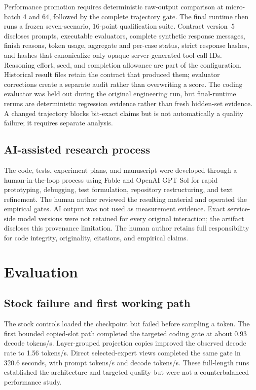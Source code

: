 \documentclass[10pt,twocolumn]{article}
\begin{document}
Performance promotion requires deterministic raw-output comparison at
micro-batch 4 and 64, followed by the complete trajectory gate.  The final
runtime then runs a frozen seven-scenario, 16-point qualification suite.
Contract version~5 discloses prompts, executable evaluators, complete
synthetic response messages, finish reasons, token usage, aggregate and
per-case status, strict response hashes, and hashes that canonicalize only
opaque server-generated tool-call IDs.  Reasoning effort, seed, and completion
allowance are part of the configuration.  Historical result files retain the
contract that produced them; evaluator corrections create a separate audit
rather than overwriting a score.  The coding evaluator was held out during
the original engineering run, but final-runtime reruns are deterministic
regression evidence rather than fresh hidden-set evidence.  A changed
trajectory blocks bit-exact claims but is not
automatically a quality failure; it requires separate analysis.

\subsection{AI-assisted research process}

The code, tests, experiment plans, and manuscript were developed through a
human-in-the-loop process using Fable and OpenAI GPT Sol for rapid prototyping,
debugging, test formulation, repository restructuring, and text refinement.
The human author reviewed the resulting material and operated the empirical
gates.  AI output was not used as measurement evidence.  Exact service-side
model versions were not retained for every original interaction; the artifact
discloses this provenance limitation.  The human author retains full
responsibility for code integrity, originality, citations, and empirical
claims.

\section{Evaluation}

\subsection{Stock failure and first working path}

The stock controls loaded the checkpoint but failed before sampling a token.
The first bounded copied-slot path completed the targeted coding gate at about
0.93 decode tokens/s.  Layer-grouped projection copies improved the observed
decode rate to 1.56 tokens/s.  Direct selected-expert views completed the same
gate in 320.6 seconds, with \CurrentDirectPromptRate{} prompt tokens/s and
\CurrentDirectDecodeRate{} decode tokens/s.  These full-length runs established
the architecture and targeted quality but were not a counterbalanced
performance study.
\end{document}
